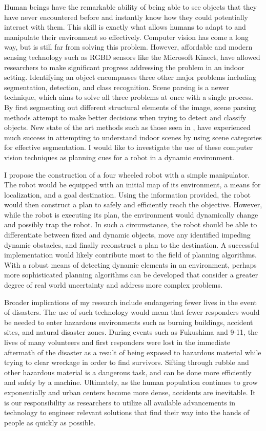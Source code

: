 \documentclass[10pt]{article}
\begin{document}
Human beings have the remarkable ability of being able to see objects that they
have never encountered before and instantly know how they could potentially
interact with them. This skill is exactly what allows humans to adapt to and
manipulate their environment so effectively. Computer vision has come a long
way, but is still far from solving this problem. However, affordable and modern
sensing technology such as RGBD sensors like the Microsoft Kinect, have allowed
researchers to make significant progress addressing the problem in an indoor
setting.  Identifying an object encompasses three other major problems
including segmentation, detection, and class recognition. Scene parsing is a
newer technique, which aims to solve all three problems at once with a single
process. By first segmenting out different structural elements of the image,
scene parsing methods attempt to make better decisions when trying to detect
and classify objects. New state of the art methods such as those seen in
\cite{gupta}, have experienced much success in attempting to understand indoor
scenes by using scene categories for effective segmentation. I would like to
investigate the use of these computer vision techniques as planning cues for a
robot in a dynamic environment.

I propose the construction of a four wheeled robot with a simple manipulator.
The robot would be equipped with an initial map of its environment, a means for
localization, and a goal destination. Using the information provided, the robot
would then construct a plan to safely and efficiently reach the objective.
However, while the robot is executing its plan, the environment would
dynamically change and possibly trap the robot.  In such a circumstance, the
robot should be able to differentiate between fixed and dynamic objects, move
any identified impeding dynamic obstacles, and finally reconstruct a plan to
the destination. A successful implementation would likely contribute most to
the field of planning algorithms. With a robust means of detecting dynamic
elements in an environment, perhaps more sophisticated planning algorithms can
be developed that consider a greater degree of real world uncertainty and
address more complex problems.

Broader implications of my research include endangering fewer lives in the
event of disasters. The use of such technology would mean that fewer responders
would be needed to enter hazardous environments such as burning buildings,
accident sites, and natural disaster zones. During events such as Fukushima and
9-11, the lives of many volunteers and first responders were lost in the
immediate aftermath of the disaster as a result of being exposed to hazardous
material while trying to clear wreckage in order to find survivors. Sifting
through rubble and other hazardous material is a dangerous task, and can be
done more efficiently and safely by a machine. Ultimately, as the human
population continues to grow exponentially and urban centers become more dense,
accidents are inevitable. It is our responsibility as researchers to utilize
all available advancements in technology to engineer relevant solutions that
find their way into the hands of people as quickly as possible.
\end{document}
